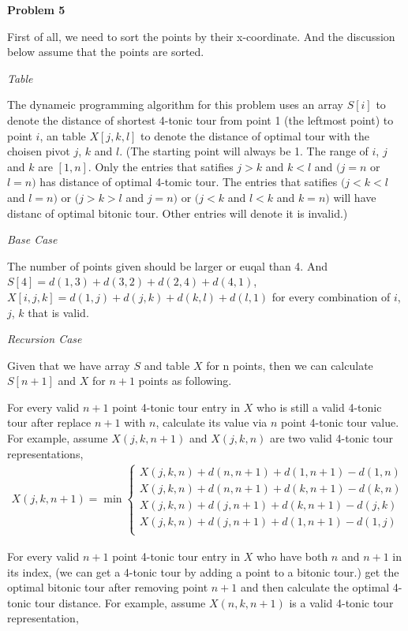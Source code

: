 \documentclass[12pt,letterpaper]{article}
\def\pp{\par\noindent}
\newcommand{\problem}[1]{ \bigskip \pp \textbf{Problem #1}\par}
\begin{document}
\problem{5}
First of all, we need to sort the points by their x-coordinate. And the discussion below assume that the points are sorted.\par
\medskip\noindent\textit{Table}\par
The dynameic programming algorithm for this problem uses an array $S[i]$ to denote the distance of shortest 4-tonic tour from point 1 (the leftmost point) to point $i$, an table $X[j,k,l]$ to denote the distance of optimal tour with the choisen pivot $j$, $k$ and $l$. (The starting point will always be 1. The range of $i$, $j$ and $k$ are $[1,n]$. Only the entries that satifies $j>k$ and $k<l$ and $(j=n$ or $l=n)$ has distance of optimal 4-tomic tour. The entries that satifies $(j<k<l$ and $l=n)$ or $(j>k>l$ and $j=n)$ or $(j<k$ and $l<k$ and $k=n)$ will have distanc of optimal bitonic tour. Other entries will denote it is invalid.)\par
\medskip\noindent\textit{Base Case}\par
The number of points given should be larger or euqal than 4. And $S[4]=d(1,3)+d(3,2)+d(2,4)+d(4,1)$, $X[i,j,k]=d(1,j)+d(j,k)+d(k,l)+d(l,1)$ for every combination of $i$, $j$, $k$ that is valid.\par
\medskip\noindent\textit{Recursion Case}\par
Given that we have array $S$ and table $X$ for n points, then we can calculate $S[n+1]$ and $X$ for $n+1$ points as following.\par
For every valid $n+1$ point 4-tonic tour entry in $X$ who is still a valid 4-tonic tour after replace $n+1$ with $n$, calculate its value via $n$ point 4-tonic tour value. For example, assume $X(j,k,n+1)$ and $X(j,k,n)$ are two valid 4-tonic tour representations,
\begin{align*}
	X(j,k,n+1)=\min
	\begin{cases}
		X(j,k,n)+d(n,n+1)+d(1,n+1)-d(1,n)\\
		X(j,k,n)+d(n,n+1)+d(k,n+1)-d(k,n)\\
		X(j,k,n)+d(j,n+1)+d(k,n+1)-d(j,k)\\
		X(j,k,n)+d(j,n+1)+d(1,n+1)-d(1,j)\\
	\end{cases}
\end{align*}\par
For every valid $n+1$ point 4-tonic tour entry in $X$ who have both $n$ and $n+1$ in its index, (we can get a 4-tonic tour by adding a point to a bitonic tour.) get the optimal bitonic tour after removing point $n+1$ and then calculate the optimal 4-tonic tour distance. For example, assume $X(n, k, n+1)$ is a valid 4-tonic tour representation,
\end{document}
